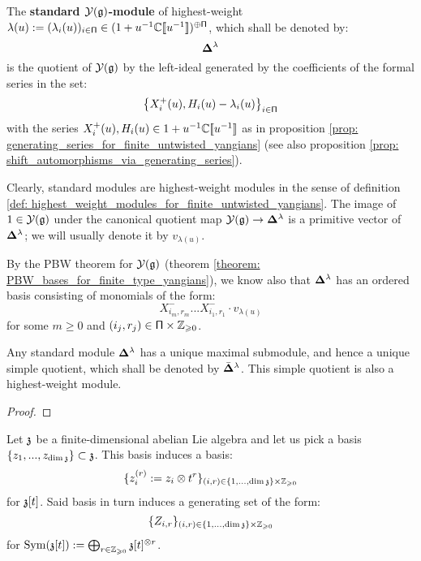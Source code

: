         \begin{definition} \label{def: standard_modules_for_finite_untwisted_yangians}
            The \textbf{standard $\mathcal{Y}(\mathfrak{g})$-module} of highest-weight $\lambda(u) := ( \lambda_i(u) )_{i \in \mathsf{\Pi}} \in (1 + u^{-1} \mathbb{C}[\![u^{-1}]\!])^{\oplus \mathsf{\Pi}}$, which shall be denoted by:
                $$\mathbf{ \Delta }^{\lambda}$$
            is the quotient of $\mathcal{Y}(\mathfrak{g})$ by the left-ideal generated by the coefficients of the formal series in the set:
                $$\left\{ X_i^+(u), H_i(u) - \lambda_i(u) \right\}_{i \in \mathsf{\Pi}}$$
            with the series $X_i^+(u), H_i(u) \in 1 + u^{-1} \mathbb{C}[\![u^{-1}]\!]$ as in proposition \ref{prop: generating_series_for_finite_untwisted_yangians} (see also proposition \ref{prop: shift_automorphisms_via_generating_series}).
        \end{definition}
        Clearly, standard modules are highest-weight modules in the sense of definition \ref{def: highest_weight_modules_for_finite_untwisted_yangians}. The image of $1 \in \mathcal{Y}(\mathfrak{g})$ under the canonical quotient map $\mathcal{Y}(\mathfrak{g}) \to \mathbf{ \Delta }^{\lambda}$ is a primitive vector of $\mathbf{ \Delta }^{\lambda}$; we will usually denote it by $v_{\lambda(u)}$.

        By the PBW theorem for $\mathcal{Y}(\mathfrak{g})$ (theorem \ref{theorem: PBW_bases_for_finite_type_yangians}), we know also that $\mathbf{ \Delta }^{\lambda}$ has an ordered basis consisting of monomials of the form:
            $$X^-_{i_m, r_m} ... X^-_{i_1, r_1} \cdot v_{\lambda(u)}$$
        for some $m \geq 0$ and $(i_j, r_j) \in \simpleroots \x \Z_{\geq 0}$.

        \begin{lemma} \label{lemma: unqiue_simple_quotients_of_finite_untwisted_yangian_standard_modules}
            Any standard module $\mathbf{ \Delta }^{\lambda}$ has a unique maximal submodule, and hence a unique simple quotient, which shall be denoted by $\bar{ \mathbf{ \Delta } }^{\lambda}$. This simple quotient is also a highest-weight module.
        \end{lemma}
            \begin{proof}
                
            \end{proof}

        Let $\mathfrak{z}$ be a finite-dimensional abelian Lie algebra and let us pick a basis $\{z_1, ..., z_{\dim \mathfrak{z}}\} \subset \mathfrak{z}$. This basis induces a basis:
            $$\{ z_i^{(r)} := z_i \tensor t^r \}_{(i, r) \in \{1, ..., \dim \z\} \x \Z_{\geq 0}}$$
        for $\mathfrak{z}[t]$. Said basis in turn induces a generating set of the form:
            $$\{ Z_{i, r} \}_{(i, r) \in \{1, ..., \dim \z\} \x \Z_{\geq 0}}$$
        for $\Sym(\z[t]) := \bigoplus_{r \in \Z_{\geq 0}} \z[t]^{\tensor r}$.
        
